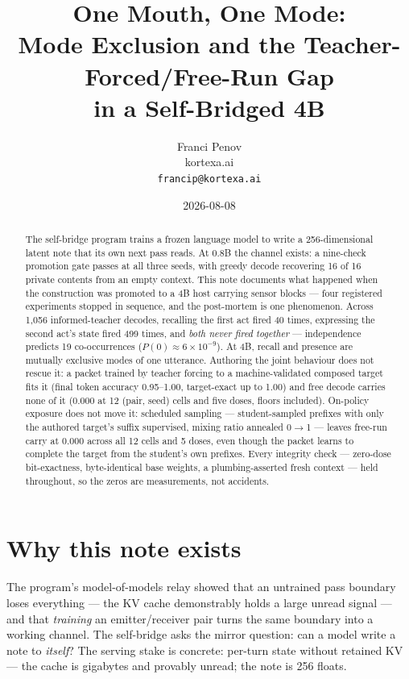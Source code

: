 \documentclass[11pt]{article}
\title{One Mouth, One Mode:\\Mode Exclusion and the Teacher-Forced/Free-Run Gap\\in a Self-Bridged 4B}
\author{Franci Penov \\ kortexa.ai \\ \texttt{francip@kortexa.ai}}
\date{2026-08-08}
\begin{document}
\maketitle

\begin{abstract}
The self-bridge program trains a frozen language model to write a
256-dimensional latent note that its own next pass reads.  At 0.8B the
channel exists: a nine-check promotion gate passes at all three seeds, with
greedy decode recovering 16 of 16 private contents from an empty context.
This note documents what happened when the construction was promoted to a 4B
host carrying sensor blocks --- four registered experiments stopped in
sequence, and the post-mortem is one phenomenon.  Across
1,056 informed-teacher decodes, recalling the first act fired
40 times, expressing the second act's state fired
499 times, and \emph{both never fired together} ---
independence predicts 19 co-occurrences
($P(0) \approx 6\times 10^{-9}$).  At 4B, recall and presence are
mutually exclusive modes of one utterance.  Authoring the joint behaviour
does not rescue it: a packet trained by teacher forcing to a
machine-validated composed target fits it (final token accuracy
0.95--1.00, target-exact up to 1.00) and
free decode carries none of it (0.000 at 12 (pair, seed)
cells and five doses, floors included).  On-policy exposure does not move it: scheduled sampling --- student-sampled prefixes with only the authored target's suffix supervised, mixing ratio annealed 0$\to$1 --- leaves free-run carry at 0.000 across all 12 cells and 5 doses, even though the packet learns to complete the target from the student's own prefixes.  Every integrity
check --- zero-dose bit-exactness, byte-identical base weights, a
plumbing-asserted fresh context --- held throughout, so the zeros are
measurements, not accidents.
\end{abstract}

\section{Why this note exists}

The program's model-of-models relay showed that an untrained pass boundary
loses everything --- the KV cache demonstrably holds a large unread signal
--- and that \emph{training} an emitter/receiver pair turns the same
boundary into a working channel.  The self-bridge asks the mirror question:
can a model write a note to \emph{itself}?  The serving stake is concrete:
per-turn state without retained KV --- the cache is gigabytes and provably
unread; the note is 256 floats.
\end{document}
